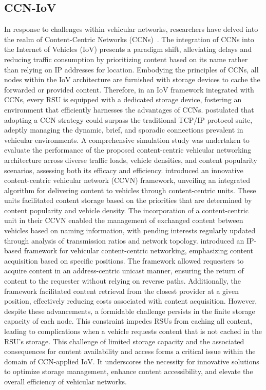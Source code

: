 \documentclass[journal]{IEEEtran}
\begin{document}
\subsection{CCN-IoV}
In response to challenges within vehicular networks, researchers have delved into the realm of Content-Centric Networks (CCNs)~\cite{Amadeo2012, Su2017, Wang2019}.
The integration of CCNs into the Internet of Vehicles (IoV) presents a paradigm shift, alleviating delays and reducing traffic consumption by prioritizing content based on its name rather than relying on IP addresses for location.
Embodying the principles of CCNs, all nodes within the IoV architecture are furnished with storage devices to cache the forwarded or provided content.
Therefore, in an IoV framework integrated with CCNs, every RSU is equipped with a dedicated storage device, fostering an environment that efficiently harnesses the advantages of CCNs.
\cite{Amadeo2012} postulated that adopting a CCN strategy could surpass the traditional TCP/IP protocol suite, adeptly managing the dynamic, brief, and sporadic connections prevalent in vehicular environments.
A comprehensive simulation study was undertaken to evaluate the performance of the proposed content-centric vehicular networking architecture across diverse traffic loads, vehicle densities, and content popularity scenarios, assessing both its efficacy and efficiency.
\cite{Su2017} introduced an innovative content-centric vehicular network (CCVN) framework, unveiling an integrated algorithm for delivering content to vehicles through content-centric units.
These units facilitated content storage based on the priorities that are determined by content popularity and vehicle density.
The incorporation of a content-centric unit in their CCVN enabled the management of exchanged content between vehicles based on naming information, with pending interests regularly updated through analysis of transmission ratios and network topology.
\cite{Wang2019} introduced an IP-based framework for vehicular content-centric networking, emphasizing content acquisition based on specific positions.
The framework allowed requesters to acquire content in an address-centric unicast manner, ensuring the return of content to the requester without relying on reverse paths.
Additionally, the framework facilitated content retrieval from the closest provider at a given position, effectively reducing costs associated with content acquisition.
However, despite these advancements, a formidable challenge persists in the finite storage capacity of each node.
This constraint impedes RSUs from caching all content, leading to complications when a vehicle requests content that is not cached in the RSU's storage.
This challenge of limited storage capacity and the associated consequences for content availability and access forms a critical issue within the domain of CCN-applied IoV.
It underscores the necessity for innovative solutions to optimize storage management, enhance content accessibility, and elevate the overall efficiency of vehicular networks.
\end{document}
